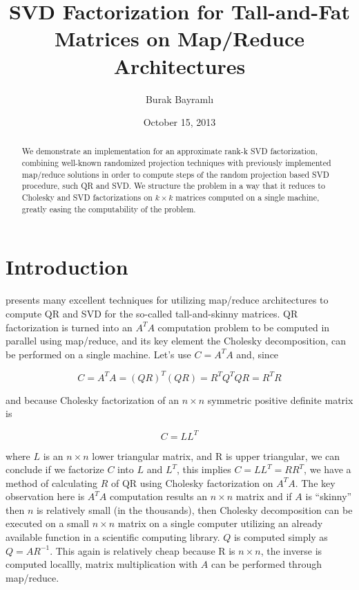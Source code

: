 \documentclass[11pt]{article}
\begin{document}
\title{SVD Factorization for Tall-and-Fat Matrices on Map/Reduce Architectures} 
\author{Burak Bayramlı} \date{October 15, 2013}

\maketitle

\begin{abstract}
  We demonstrate an implementation for an approximate rank-k SVD
  factorization, combining well-known randomized projection techniques with
  previously implemented map/reduce solutions in order to compute steps of
  the random projection based SVD procedure, such QR and SVD. We structure
  the problem in a way that it reduces to Cholesky and SVD factorizations
  on $k \times k$ matrices computed on a single machine, greatly easing the
  computability of the problem.
\end{abstract}

\section{Introduction} \label{intro}

\cite{gleich} presents many excellent techniques for utilizing map/reduce
architectures to compute QR and SVD for the so-called tall-and-skinny
matrices. QR factorization is turned into an $A^TA$ computation problem to
be computed in parallel using map/reduce, and its key element the Cholesky
decomposition, can be performed on a single machine. Let's use $C = A^TA$
and, since

$$ C = A^TA = (QR)^T(QR) = R^TQ^TQR = R^TR $$

and because Cholesky factorization of an $n \times n$ symmetric positive
definite matrix is

$$ C = LL^T $$

where $L$ is an $n \times n$ lower triangular matrix, and R is upper
triangular, we can conclude if we factorize $C$ into $L$ and $L^T$, this
implies $C = LL^T = RR^T$, we have a method of calculating $R$ of QR using
Cholesky factorization on $A^TA$. The key observation here is $A^TA$
computation results an $n \times n$ matrix and if $A$ is ``skinny'' then
$n$ is relatively small (in the thousands), then Cholesky decomposition can
be executed on a small $n \times n$ matrix on a single computer utilizing
an already available function in a scientific computing library. $Q$ is
computed simply as $Q = AR^{-1}$. This again is relatively cheap because R
is $n \times n$, the inverse is computed locallly, matrix multiplication
with $A$ can be performed through map/reduce.
\end{document}
